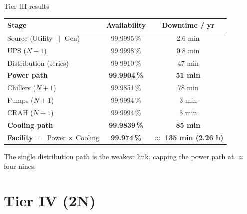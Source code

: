 \documentclass[aspectratio=169,10pt]{beamer}
\begin{document}
\begin{frame}{Tier III results}
  \centering
  \renewcommand{\arraystretch}{1.2}
  \begin{tabular}{lcc}
    \toprule
    \textbf{Stage} & \textbf{Availability} & \textbf{Downtime / yr} \\
    \midrule
    Source (Utility $\parallel$ Gen) & 99.9995\,\% & 2.6 min \\
    UPS ($N{+}1$)                    & 99.9998\,\% & 0.8 min \\
    Distribution (series)            & 99.9910\,\% & 47 min  \\
    \addlinespace
    \textbf{Power path}              & \textbf{99.9904\,\%} & \textbf{51 min} \\
    \midrule
    Chillers ($N{+}1$)               & 99.9851\,\% & 78 min \\
    Pumps ($N{+}1$)                  & 99.9994\,\% & 3 min  \\
    CRAH ($N{+}1$)                   & 99.9994\,\% & 3 min  \\
    \addlinespace
    \textbf{Cooling path}            & \textbf{99.9839\,\%} & \textbf{85 min} \\
    \midrule
    \rowcolor{surf2}
    \textbf{Facility} $=$ Power $\times$ Cooling & \textbf{99.974\,\%} & \textbf{$\approx$ 135 min (2.26 h)} \\
    \bottomrule
  \end{tabular}

  \vspace{0.8em}
  \small The single distribution path is the weakest link, capping the power path at $\approx$ four nines.
\end{frame}

\section{Tier IV (2N)}
\end{document}
